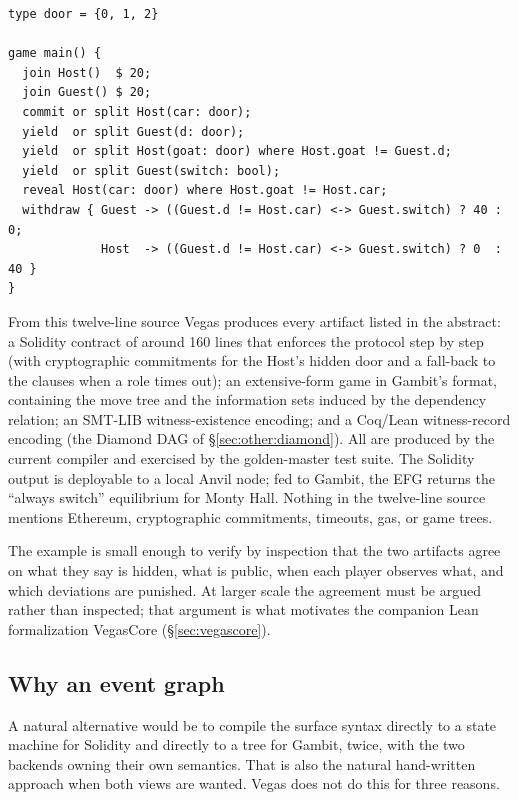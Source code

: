 \begin{lstlisting}[style=vg]
type door = {0, 1, 2}

game main() {
  join Host()  $ 20;
  join Guest() $ 20;
  commit or split Host(car: door);
  yield  or split Guest(d: door);
  yield  or split Host(goat: door) where Host.goat != Guest.d;
  yield  or split Guest(switch: bool);
  reveal Host(car: door) where Host.goat != Host.car;
  withdraw { Guest -> ((Guest.d != Host.car) <-> Guest.switch) ? 40 : 0;
             Host  -> ((Guest.d != Host.car) <-> Guest.switch) ? 0  : 40 }
}
\end{lstlisting}

From this twelve-line source Vegas produces every artifact listed
in the abstract: a Solidity contract of around 160 lines that
enforces the protocol step by step (with cryptographic
commitments for the Host's hidden door and a fall-back to the
 clauses when a role times out); an extensive-form
game in Gambit's format, containing the move tree and the
information sets induced by the dependency relation; an SMT-LIB
witness-existence encoding; and a Coq/Lean witness-record
encoding (the Diamond DAG of \S\ref{sec:other:diamond}).  All are
produced by the current compiler and exercised by the
golden-master test suite.  The Solidity output is deployable to a
local Anvil node; fed to Gambit, the EFG returns the
``always switch'' equilibrium for Monty Hall.  Nothing in the
twelve-line source mentions Ethereum, cryptographic commitments,
timeouts, gas, or game trees.

The example is small enough to verify by inspection that the two
artifacts agree on what they say is hidden, what is public, when
each player observes what, and which deviations are punished.  At larger scale the agreement must be argued rather than
inspected; that argument is what motivates the companion Lean
formalization VegasCore (\S\ref{sec:vegascore}).

\subsection{Why an event graph}
\label{sec:intro:why-graph}

A natural alternative would be to compile the surface syntax
directly to a state machine for Solidity and directly to a tree
for Gambit, twice, with the two backends owning their own
semantics.  That is also the natural hand-written approach when both views
are wanted.  Vegas does not do this for three reasons.

